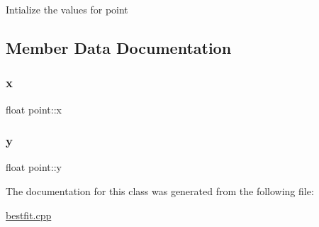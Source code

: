 Intialize the values for point

\subsection{Member Data Documentation}
\mbox{\label{classpoint_a8293fd2de3ce739deb6d53691fd21fcf}} 
\subsubsection{\texorpdfstring{x}{x}}
{\footnotesize\ttfamily float point\+::x}

\mbox{\label{classpoint_a616ad85a2096d1566f5971666bbc3b3f}} 
\subsubsection{\texorpdfstring{y}{y}}
{\footnotesize\ttfamily float point\+::y}



The documentation for this class was generated from the following file\+:\begin{DoxyCompactItemize}
\item 
\hyperlink{bestfit_8cpp}{bestfit.\+cpp}\end{DoxyCompactItemize}
